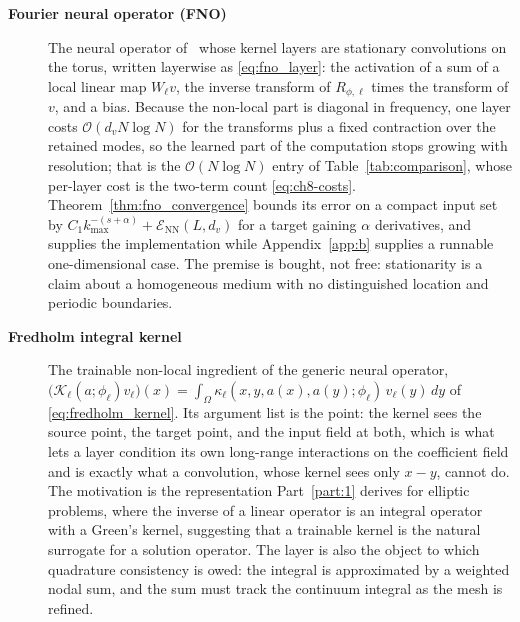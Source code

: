 \begin{description}
\item[\textbf{Fourier neural operator (FNO)}] The neural operator
of~\cite{li2021fourier} whose kernel layers are stationary convolutions on the torus,
written layerwise as \eqref{eq:fno_layer}: the activation of a sum of a local linear
map $W_{\ell} v$, the inverse transform of $R_{\phi,\ell}$ times the transform of $v$,
and a bias. Because the non-local part is diagonal in frequency, one layer costs
$\mathcal{O}(d_{v} N \log N)$ for the transforms plus a fixed contraction over the
retained modes, so the learned part of the computation stops growing with resolution;
that is the $\mathcal{O}(N \log N)$ entry of Table~\ref{tab:comparison}, whose per-layer
cost is the two-term count \eqref{eq:ch8-costs}.
Theorem~\ref{thm:fno_convergence} bounds its error on a compact input set by
$C_{1} k_{\max}^{-(s+\alpha)} + \mathcal{E}_{\text{NN}}(L, d_{v})$ for a target
gaining $\alpha$ derivatives, and 
supplies the implementation while Appendix~\ref{app:b} supplies a runnable
one-dimensional case. The premise is bought, not free: stationarity is a claim about a
homogeneous medium with no distinguished location and periodic boundaries.

\item[\textbf{Fredholm integral kernel}] The trainable non-local ingredient of the
generic neural operator, $\big(\mathcal{K}_{\ell}(a; \phi_{\ell}) v_{\ell}\big)(x) =
\int_{\Omega} \kappa_{\ell}(x, y, a(x), a(y); \phi_{\ell})\, v_{\ell}(y)\, dy$ of
\eqref{eq:fredholm_kernel}. Its argument list is the point: the kernel sees the source
point, the target point, and the input field at both, which is what lets a layer
condition its own long-range interactions on the coefficient field and is exactly what
a convolution, whose kernel sees only $x - y$, cannot do. The motivation is the
representation Part~\ref{part:1} derives for elliptic problems, where the inverse of a
linear operator is an integral operator with a Green's kernel, suggesting that a
trainable kernel is the natural surrogate for a solution operator. The layer is also
the object to which quadrature consistency is owed: the integral is approximated by a
weighted nodal sum, and the sum must track the continuum integral as the mesh is
refined. 


\end{description}
